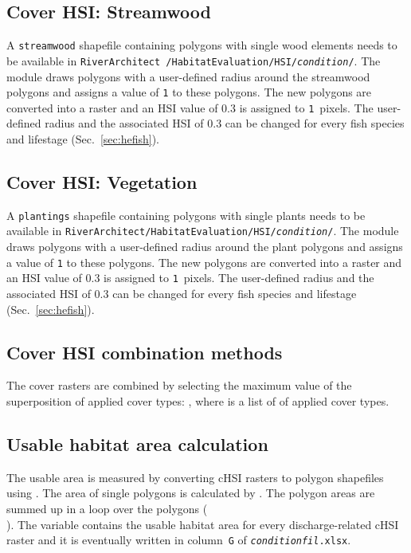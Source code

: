 \subsection{Cover HSI: Streamwood}\label{sec:woohsi}
A \texttt{streamwood} shapefile containing polygons with single wood elements needs to be available in \texttt{RiverArchitect /HabitatEvaluation/HSI/\textit{condition}/}. The module draws polygons with a user-defined radius around the streamwood polygons and assigns a value of \texttt{1} to these polygons. The new polygons are converted into a raster and an HSI value of 0.3 is assigned to \texttt{1}~pixels. The user-defined radius and the associated HSI of 0.3 can be changed for every fish species and lifestage (Sec.~\ref{sec:hefish}).

\subsection{Cover HSI: Vegetation}\label{sec:veghsi}
A \texttt{plantings} shapefile containing polygons with single plants needs to be available in \texttt{RiverArchitect/HabitatEvaluation/HSI/\textit{condition}/}. The module draws polygons with a user-defined radius around the plant polygons and assigns a value of \texttt{1} to these polygons. The new polygons are converted into a raster and an HSI value of 0.3 is assigned to \texttt{1}~pixels. The user-defined radius and the associated HSI of 0.3 can be changed for every fish species and lifestage (Sec.~\ref{sec:hefish}).


\subsection{Cover HSI combination methods}\label{sec:hecombinecov}
The cover rasters are combined by selecting the maximum value of the superposition of applied cover types: , where  is a list of  of applied cover types.


\subsection{Usable habitat area calculation}\label{sec:hewuamethods}
The usable area is measured by converting cHSI rasters to polygon shapefiles using . The area of single polygons is calculated by . The polygon areas are summed up in a loop over the polygons (\\). The  variable contains the usable habitat area for every discharge-related cHSI raster and it is eventually written in column~\texttt{G} of \texttt{\textit{condition}{\myUnderscore}\textit{fil}.xlsx}.

